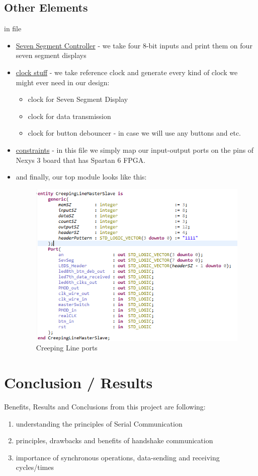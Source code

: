 \documentclass{article}
\begin{document}
\subsection{Other Elements}
in file 
\begin{itemize}
  \item \href{/vhd/SevSeg.vhd}{Seven Segment Controller} - we take four 8-bit inputs and print them on four seven segment displays
  \item \href{/vhd/ClockStuff.vhd}{clock stuff} - we take reference clock and generate every kind of clock we might ever need in our design:
  \begin{itemize}
  \item clock for Seven Segment Display
  \item clock for data transmission
  \item clock for button debouncer - in case we will use any buttons and etc.
  \end{itemize}
  \item \href{/vhd/constr.ucf}{constraints} - in this file we simply map our input-output ports on the pins of Nexys 3 board that has Spartan 6 FPGA.
    \item and finally, our top module looks like this:
    \begin{figure}[H]
    \centering
    \includegraphics[scale=0.7]{CreepingLineMasterSlave.png}
    \caption{Creeping Line ports}
    \label{fig:CreepingLineMasterSlave}
\end{figure}
\end{itemize}

\section{Conclusion / Results}
Benefits, Results and Conclusions from this project are following:
\begin{enumerate}
\item understanding the principles of Serial Communication
\item principles, drawbacks and benefits of handshake communication
\item importance of synchronous operations, data-sending and receiving cycles/times
\end{enumerate}



\end{document}
